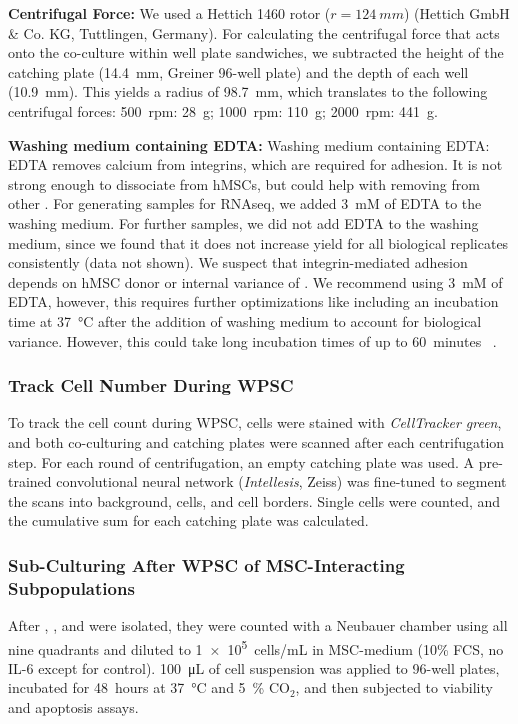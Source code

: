 \textbf{Centrifugal Force:} We used a Hettich 1460 rotor (\(r = \SI{124}{mm}\))
(Hettich GmbH \& Co. KG, Tuttlingen, Germany). For calculating the centrifugal
force that acts onto the co-culture within well plate sandwiches, we subtracted
the height of the catching plate (\SI{14.4}{mm}, Greiner 96-well plate) and the
depth of each well (\SI{10.9}{mm}). This yields a radius of \SI{98.7}{mm}, which
translates to the following centrifugal forces: \SI{500}{rpm}: \SI{28}{g};
\SI{1000}{rpm}: \SI{110}{g}; \SI{2000}{rpm}: \SI{441}{g}.

\textbf{Washing medium containing EDTA:} Washing medium containing EDTA: EDTA
removes calcium from integrins, which are required for adhesion. It is not
strong enough to dissociate \INA from hMSCs, but could help with removing \INA
from other \INA. For generating samples for RNAseq, we added \SI{3}{mM} of EDTA
to the washing medium. For further samples, we did not add EDTA to the washing
medium, since we found that it does not increase yield for all biological
replicates consistently (data not shown). We suspect that integrin-mediated
adhesion depends on hMSC donor or internal variance of \INA. We recommend using
\SI{3}{mM} of EDTA, however, this requires further optimizations like including
an incubation time at \SI{37}{\degreeCelsius} after the addition of washing
medium to account for biological variance. However, this could take long
incubation times of up to \SI{60}{minutes}  \cite{laiDifferentMethodsDetaching2022}.

\subsubsection*{Track Cell Number During WPSC}
To track the cell count during WPSC, \INA cells were stained with \textit{CellTracker
    green}, and both co-culturing and catching plates were scanned after each
centrifugation step. For each round of centrifugation, an empty catching plate
was used. A pre-trained convolutional neural network (\textit{Intellesis}, Zeiss) was
fine-tuned to segment the scans into background, cells, and cell borders. Single
cells were counted, and the cumulative sum for each catching plate was
calculated.

\subsubsection*{Sub-Culturing After WPSC of MSC-Interacting \INA Subpopulations}
After \CMina, \nMAina, and \MAina were isolated, they were counted with a
Neubauer chamber using all nine quadrants and diluted to \SI{1e5}{cells/mL} in
MSC-medium (10\% FCS, no IL-6 except for control). \SI{100}{\micro\liter} of
cell suspension was applied to 96-well plates, incubated for \SI{48}{hours} at
\SI{37}{\degreeCelsius} and \SI{5}{\percent} CO$_2$, and then subjected to
viability and apoptosis assays.

